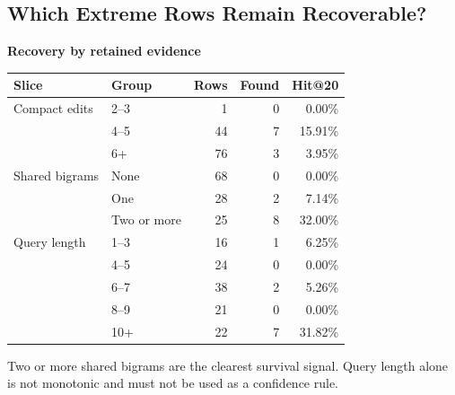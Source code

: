 \documentclass[11pt,a4paper]{article}
\begin{document}
\subsection{Which Extreme Rows Remain Recoverable?}

\begin{minipage}[t]{0.49\linewidth}
\textbf{Recovery by retained evidence}\par\smallskip
\small
\centering
\begin{tabular}{@{}llrrr@{}}
\toprule
\textbf{Slice} & \textbf{Group} & \textbf{Rows} & \textbf{Found} & \textbf{Hit@20} \\
\midrule
Compact edits & 2--3 & 1 & 0 & 0.00\% \\
 & 4--5 & 44 & 7 & 15.91\% \\
 & 6+ & 76 & 3 & 3.95\% \\
\addlinespace
Shared bigrams & None & 68 & 0 & 0.00\% \\
 & One & 28 & 2 & 7.14\% \\
 & Two or more & 25 & 8 & 32.00\% \\
\addlinespace
Query length & 1--3 & 16 & 1 & 6.25\% \\
 & 4--5 & 24 & 0 & 0.00\% \\
 & 6--7 & 38 & 2 & 5.26\% \\
 & 8--9 & 21 & 0 & 0.00\% \\
 & 10+ & 22 & 7 & 31.82\% \\
\bottomrule
\end{tabular}
\par\smallskip
\raggedright
Two or more shared bigrams are the clearest survival signal. Query length alone
is not monotonic and must not be used as a confidence rule.
\end{minipage}
\hfill
\end{document}
